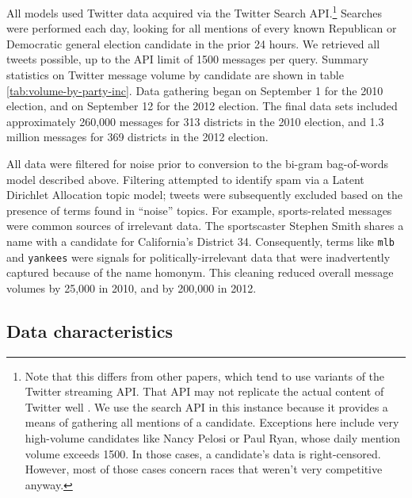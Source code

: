 \documentclass{sig-alternate-2013}
\begin{document}
All models used Twitter data acquired via the Twitter Search
API.\footnote{Note that this differs from other papers, which tend to
  use variants of the Twitter streaming API. That API may not
  replicate the actual content of Twitter well
  \cite{morstatter2013sample}. We use the search API in
  this instance because it provides a means of gathering all mentions
  of a candidate. Exceptions here include very
  high-volume candidates like Nancy Pelosi or
  Paul Ryan, whose daily mention volume exceeds 1500. In those cases, a candidate's data is
  right-censored. However, most of those cases concern races that
  weren't very competitive anyway.} Searches were performed each day,
looking for all mentions of every
known Republican or Democratic general election candidate in the prior
24 hours. We retrieved all tweets possible, up to the API limit of 1500 messages per query. Summary
statistics on Twitter message volume by candidate are shown in table
\ref{tab:volume-by-party-inc}. Data gathering began
on September 1 for the 2010 election, and on September 12 for the 2012
election. The final data sets included approximately 260,000 messages for
313 districts in the 2010 election, and 1.3 million messages for 369
districts in the 2012 election.

All data were filtered for noise prior to conversion to the bi-gram
bag-of-words model described above. Filtering attempted to identify
spam via a Latent Dirichlet Allocation topic model; tweets were
subsequently excluded based on the presence of terms found in
``noise'' topics. For example, sports-related messages were common
sources of irrelevant data. The sportscaster Stephen Smith shares a
name with a candidate for California's District 34. Consequently,
terms like \texttt{mlb} and \texttt{yankees} were signals for
politically-irrelevant data that were inadvertently captured because
of the name homonym. This cleaning reduced overall message volumes by
25,000 in 2010, and by 200,000 in 2012.


\subsection{Data characteristics}
\label{sec:data-characteristics}
\end{document}
